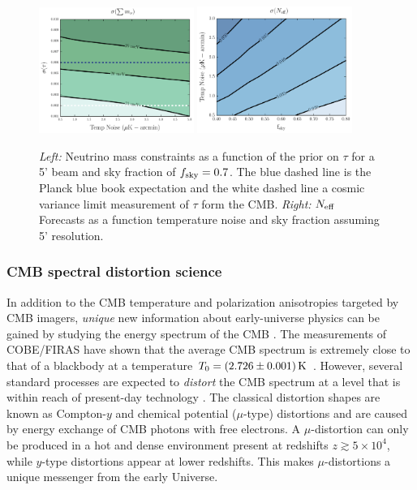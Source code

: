 \begin{figure}[t!]
\begin{center}
\includegraphics[width=0.45\textwidth]{figs/Mnu_tauprior.pdf}
\includegraphics[width=0.45\textwidth]{figs/Neff.pdf}
\caption{ {\it Left:} Neutrino mass constraints as a function of the prior on $\tau$ for a 5' beam and sky fraction of $f_{\rm sky} = 0.7$.  The blue dashed line is the Planck blue book expectation and the white dashed line a cosmic variance limit measurement of $\tau$ form the CMB. {\it Right:} ${N_{\rm eff}}$ Forecasts as a function temperature noise and sky fraction assuming 5' resolution.}
\label{fig:Neff_future}
\end{center}
\end{figure}


\vspace{-0.15in}
\subsubsection{CMB spectral distortion science}
\vspace{-0.05in}

In addition to the CMB temperature and polarization anisotropies targeted by CMB imagers, {\it unique} new information about early-universe physics can be gained by studying the energy spectrum of the CMB \citep{Sunyaev1970SPEC, Burigana1993, Hu1993, Chluba2011therm}. The measurements of COBE/FIRAS have shown that the average CMB spectrum is extremely close to that of a blackbody at a temperature $T_0=(2.726\pm 0.001)\,{\rm K}$ \citep{Mather1994, Fixsen1996}. However, several standard processes are expected to {\it distort} the CMB spectrum \citep[e.g.,][]{Chluba2016LCDM} at a level that is within reach of present-day technology \citep{Kogut2011PIXIE, PRISM2013WPII}. 
%
The classical distortion shapes are known as Compton-$y$ and chemical potential ($\mu$-type) distortions \citep{Zeldovich1969, Sunyaev1970mu} and are caused by energy exchange of CMB photons with free electrons. A $\mu$-distortion can only be produced in a hot and dense environment present at redshifts $z\gtrsim 5\times10^4$, while $y$-type distortions appear at lower redshifts. This makes $\mu$-distortions a unique messenger from the early Universe.

